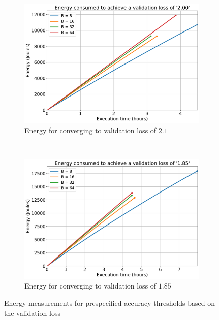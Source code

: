 \documentclass{article}
\begin{document}
{        \begin{figure}[H]
            \centering
            \begin{subfigure}[b]{0.47 \textwidth}
                \includegraphics[trim = {0.0in 0.0in 0.0in 0.0in}, clip, width = 1.0 \textwidth]{../Figures/time_vs_energy_converged_validation_200.pdf}
                \caption{Energy for converging to validation loss of $2.1$}
                \label{fig:convergence_energy_validation_200}
            \end{subfigure}
            ~
            \begin{subfigure}[b]{0.47 \textwidth}
                \includegraphics[trim = {0.0in 0.0in 0.0in 0.0in}, clip, width = 1.0 \textwidth]{../Figures/time_vs_energy_converged_validation_185.pdf}
                \caption{Energy for converging to validation loss of $1.85$}
                \label{fig:convergence_energy_validation_185}
            \end{subfigure}
            \caption{Energy measurements for prespecified accuracy thresholds based on the validation loss}
            \label{fig:time_vs_energy_validation}
        \end{figure}

}
\end{document}

